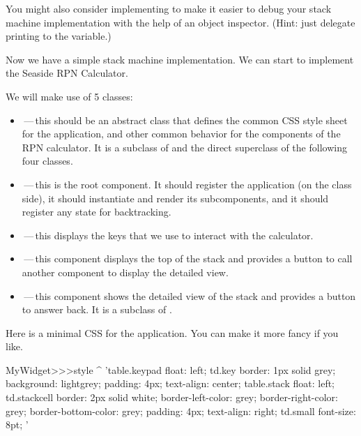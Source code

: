 \documentclass[a4paper,10pt,twoside]{book}
\begin{document}
You might also consider implementing  to make it easier to debug your stack machine implementation with the help of an object inspector.
(Hint: just delegate printing to the  variable.)


Now we have a simple stack machine implementation.
We can start to implement the Seaside RPN Calculator.

We will make use of 5 classes:
\begin{itemize}
  \item {}\,---\,this should be an abstract class that defines the common CSS style sheet for the application, and other common behavior for the components of the RPN calculator.
  It is a subclass of  and the direct superclass of the following four classes. 
  
    \item {}\,---\,this is the root component.
  It should register the application (on the class side), it should instantiate and render its subcomponents, and it should register any state for backtracking.
  \item {}\,---\,this displays the keys that we use to interact with the calculator.
  \item {}\,---\,this component displays the top of the stack and provides a button to call another component to display the detailed view.
  \item {}\,---\,this component shows the detailed view of the stack and provides a button to answer back.
  It is a subclass of .
\end{itemize}


Here is a minimal CSS for the application.
You can make it more fancy if you like.
\begin{code}{}
MyWidget>>>style
	^ 'table.keypad { float: left; }
td.key {
	border: 1px solid grey;
	background: lightgrey;
	padding: 4px;
	text-align: center;
}
table.stack { float: left; }
td.stackcell {
	border: 2px solid white;
	border-left-color: grey;
	border-right-color: grey;
	border-bottom-color: grey;
	padding: 4px;
	text-align: right;
}
td.small { font-size: 8pt; }'
\end{code}
\end{document}
